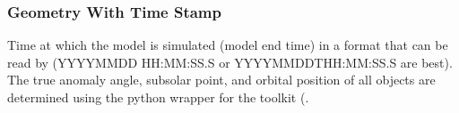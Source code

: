 \documentclass[letterpaper,10pt,english]{sphinxmanual}
\begin{document}
\subsubsection{Geometry With Time Stamp}
\label{\detokenize{nexoclom2/inputfiles:geometry-with-time-stamp}}\label{\detokenize{nexoclom2/inputfiles:geometrytime}}\begin{description}
\sphinxAtStartPar
Time at which the model is simulated (model end time) in a format that can be
read by
(YYYY\sphinxhyphen{}MM\sphinxhyphen{}DD HH:MM:SS.S or YYYY\sphinxhyphen{}MM\sphinxhyphen{}DDTHH:MM:SS.S are best).
The true anomaly angle, subsolar point, and orbital position of all objects
are determined using the
 python wrapper for the
 toolkit
(.

\end{description}
\end{document}
